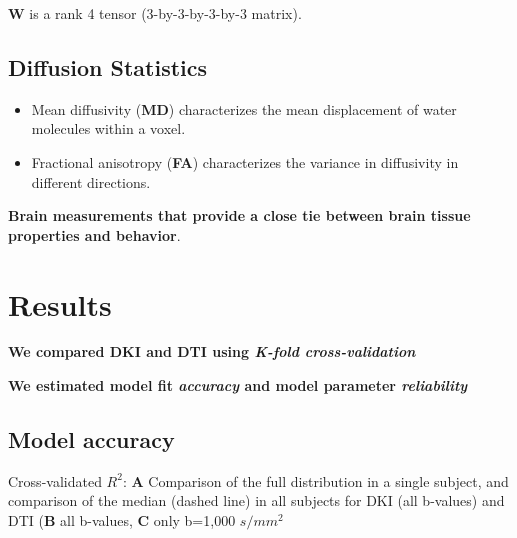 \documentclass[a0, landscape]{a0poster}
\begin{document}
\begin{multicols}{3}
\begin{center}
\begin{large}
\vspace{2mm}
\end{large}
\end{center}

$\mathbf{W}$ is a rank 4 tensor (3-by-3-by-3-by-3 matrix).

\vspace{-2mm}
\subsection*{Diffusion Statistics}

\begin{itemize}

\item Mean diffusivity (\textbf{MD}) characterizes the mean displacement of
water molecules within a voxel.

\item Fractional anisotropy (\textbf{FA}) characterizes the variance in
diffusivity in different directions.

\end{itemize}

\large

\noindent \textbf{Brain measurements that provide a close tie between brain tissue properties and behavior}.

\vfill
\columnbreak

\color{Navy}
\section*{Results}

\noindent \textbf{We compared DKI and DTI using \emph{K-fold cross-validation}}

\noindent \textbf{We estimated model fit \emph{accuracy} and model parameter \emph{reliability}}


\subsection*{Model accuracy}
\normalsize

\noindent Cross-validated $R^2$: \textbf{A} Comparison of the full distribution
in a single subject, and comparison of the median (dashed line) in all subjects
for DKI (all b-values) and DTI (\textbf{B} all b-values, \textbf{C} only b=1,000
$s/mm^2$  \hfill \break


\end{multicols}
\end{document}
